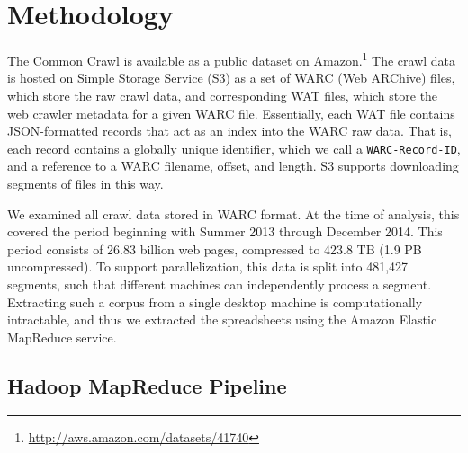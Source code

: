\documentclass[conference]{IEEEtran}
\begin{document}
\section{Methodology}



The Common Crawl is available as a public dataset on Amazon.\footnote{\url{http://aws.amazon.com/datasets/41740}} The crawl data is hosted on Simple Storage Service (S3) as a set of WARC (Web ARChive) files, which store the raw crawl data, and corresponding WAT files, which store the web crawler metadata for a given WARC file. Essentially, each WAT file contains JSON-formatted records that act as an index into the WARC raw data. That is, each record contains a globally unique identifier, which we call a \texttt{WARC-Record-ID}, and a reference to a WARC filename, offset, and length. S3 supports downloading segments of files in this way.

We examined all crawl data stored in WARC format. At the time of analysis, this covered the period beginning with Summer 2013 through December 2014. This period consists of 26.83 billion web pages, compressed to 423.8 TB (1.9 PB uncompressed). To support parallelization, this data is split into 481,427 segments, such that different machines can independently process a segment. Extracting such a corpus from a single desktop machine is computationally intractable, and thus we extracted the spreadsheets using the Amazon Elastic MapReduce service.


 

\subsection{Hadoop MapReduce Pipeline}
\end{document}
